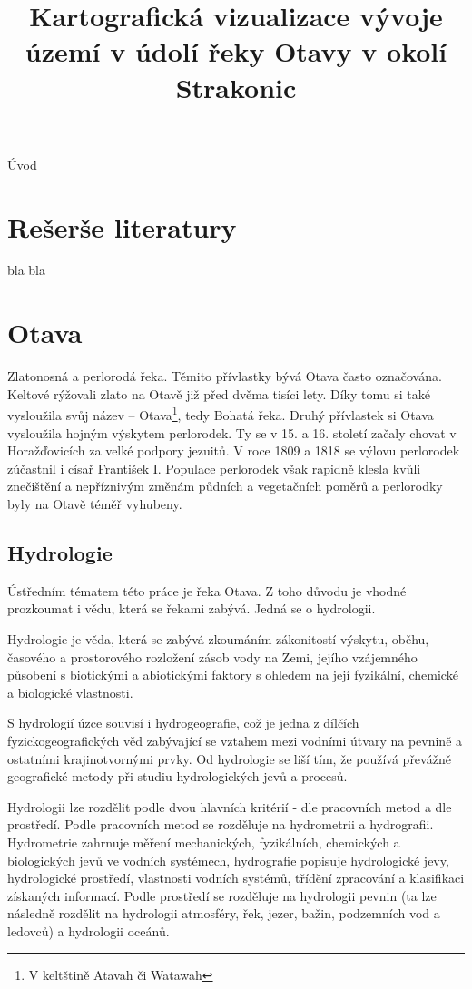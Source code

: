 \documentclass[thesis=M,czech]{FITthesis}[2012/06/26]
\title{Kartografická vizualizace vývoje území v údolí řeky Otavy v okolí Strakonic}
\begin{document}

\begin{introduction}
Úvod


\end{introduction}

\chapter{Rešerše literatury}
bla bla



\chapter{Otava}
Zlatonosná a perlorodá řeka. Těmito přívlastky bývá Otava často označována. Keltové rýžovali zlato na Otavě již před dvěma tisíci lety. Díky tomu si také vysloužila svůj název – Otava\footnote{V keltštině Atavah či Watawah}, tedy Bohatá řeka. Druhý přívlastek si Otava vysloužila hojným výskytem perlorodek. Ty se v 15. a 16. století začaly chovat v Horažďovicích za velké podpory jezuitů. V roce 1809 a 1818 se výlovu perlorodek zúčastnil i císař František I. Populace perlorodek však rapidně klesla kvůli znečištění a nepříznivým změnám půdních a vegetačních poměrů a perlorodky byly na Otavě téměř vyhubeny. \cite{SMOOS}


\section{Hydrologie}
Ústředním tématem této práce je řeka Otava. Z toho důvodu je vhodné prozkoumat i vědu, která se řekami zabývá. Jedná se o hydrologii.


Hydrologie je věda, která se zabývá zkoumáním zákonitostí výskytu, oběhu, časového a prostorového rozložení zásob vody na Zemi, jejího vzájemného působení s biotickými a abiotickými faktory s ohledem na její fyzikální, chemické a biologické vlastnosti. 


S hydrologií úzce souvisí i hydrogeografie, což je jedna z dílčích fyzickogeografických věd zabývající se vztahem mezi vodními útvary na pevnině a ostatními krajinotvornými prvky. Od hydrologie se liší tím, že používá převážně geografické metody při studiu hydrologických jevů a procesů. 


Hydrologii lze rozdělit podle dvou hlavních kritérií - dle pracovních metod a dle prostředí. Podle pracovních metod se rozděluje na hydrometrii a hydrografii. Hydrometrie zahrnuje měření mechanických, fyzikálních, chemických a biologických jevů ve vodních systémech, hydrografie popisuje hydrologické jevy, hydrologické prostředí, vlastnosti vodních systémů, třídění zpracování a klasifikaci získaných informací. Podle prostředí se rozděluje na hydrologii pevnin (ta lze následně rozdělit na hydrologii atmosféry, řek, jezer, bažin, podzemních vod a ledovců) a hydrologii oceánů. 
\end{document}

